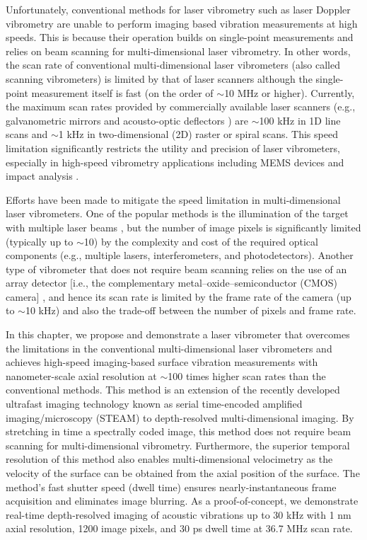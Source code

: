 Unfortunately, conventional methods for laser vibrometry such as laser Doppler vibrometry \cite{castellini2006laser,broch1980mechanical,drain1980laser,arnott1990laser,goode1996laser,huber2001evaluation} are unable to perform imaging based vibration measurements at high speeds. This is because their operation builds on single-point measurements and relies on beam scanning for multi-dimensional laser vibrometry. In other words, the scan rate of conventional multi-dimensional laser vibrometers (also called scanning vibrometers) is limited by that of laser scanners although the single-point measurement itself is fast (on the order of $\sim$10 MHz or higher). Currently, the maximum scan rates provided by commercially available laser scanners (e.g., galvanometric mirrors \cite{conant2002micromachined} and acousto-optic deflectors \cite{pape1994design}) are $\sim$100 kHz in 1D line scans and $\sim$1 kHz in two-dimensional (2D) raster or spiral scans. This speed limitation significantly restricts the utility and precision of laser vibrometers, especially in high-speed vibrometry applications including MEMS devices and impact analysis \cite{castellini2006laser,broch1980mechanical,drain1980laser}.

Efforts have been made to mitigate the speed limitation in multi-dimensional laser vibrometers. One of the popular methods is the illumination of the target with multiple laser beams \cite{zheng1998multichannel,fu2010spatially}, but the number of image pixels is significantly limited (typically up to $\sim$10) \cite{zheng1998multichannel,fu2010spatially} by the complexity and cost of the required optical components (e.g., multiple lasers, interferometers, and photodetectors). Another type of vibrometer that does not require beam scanning relies on the use of an array detector [i.e., the complementary metal--oxide--semiconductor (CMOS) camera] \cite{popescu2006optical}, and hence its scan rate is limited by the frame rate of the camera (up to $\sim$10 kHz) \cite{popescu2006optical} and also the trade-off between the number of pixels and frame rate.

In this chapter, we propose and demonstrate a laser vibrometer that overcomes the limitations in the conventional multi-dimensional laser vibrometers and achieves high-speed imaging-based surface vibration measurements with nanometer-scale axial resolution at $\sim$100 times higher scan rates than the conventional methods. This method is an extension of the recently developed ultrafast imaging technology known as serial time-encoded amplified imaging/microscopy (STEAM) \cite{goda2009serial,goda2008amplified,qian2009real} to depth-resolved multi-dimensional imaging. By stretching in time a spectrally coded image, this method does not require beam scanning for multi-dimensional vibrometry. Furthermore, the superior temporal resolution of this method also enables multi-dimensional velocimetry as the velocity of the surface can be obtained from the axial position of the surface. The method's fast shutter speed (dwell time) ensures nearly-instantaneous frame acquisition and eliminates image blurring. As a proof-of-concept, we demonstrate real-time depth-resolved imaging of acoustic vibrations up to 30 kHz with 1 nm axial resolution, 1200 image pixels, and 30 ps dwell time at 36.7 MHz scan rate.

